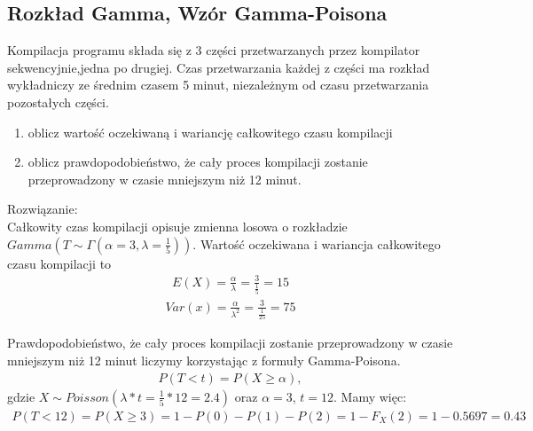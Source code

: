 \documentclass[12pt]{article}
\begin{document}
    \subsection{Rozkład Gamma, Wzór Gamma-Poisona}
    \begin{exercise}
        Kompilacja programu składa się z 3 części przetwarzanych przez kompilator sekwencyjnie,jedna po drugiej.
        Czas przetwarzania każdej z części ma rozkład wykładniczy ze średnim czasem 5 minut, niezależnym od
        czasu przetwarzania pozostałych części.
        \begin{enumerate}
            \item oblicz wartość oczekiwaną i wariancję całkowitego czasu kompilacji
            \item oblicz prawdopodobieństwo, że cały proces kompilacji zostanie przeprowadzony w
            czasie mniejszym niż 12 minut.
        \end{enumerate}
    \end{exercise}
    Rozwiązanie:\\

    Całkowity czas kompilacji opisuje zmienna losowa o rozkładzie $Gamma(T \sim \Gamma(\alpha = 3, \lambda = \frac{1}{5}))$.
    Wartość oczekiwana i wariancja całkowitego czasu kompilacji to
    \begin{align*}
        E(X) = \frac{\alpha}{\lambda} = \frac{3}{\frac{1}{5}} = 15
    \end{align*}
    \begin{align*}
        Var(x) = \frac{\alpha}{\lambda^2} = \frac{3}{\frac{1}{25}}= 75
    \end{align*}

    Prawdopodobieństwo, że cały proces kompilacji zostanie przeprowadzony w
    czasie mniejszym niż 12 minut liczymy korzystając z formuły Gamma-Poisona.
    \begin{align*}
        P(T < t) = P(X \geq \alpha),
    \end{align*}
    gdzie $X \sim Poisson(\lambda*t = \frac{1}{5} * 12 = 2.4)$ oraz $\alpha = 3$, $t = 12$. Mamy więc:
    \begin{align*}
        P(T < 12) = P (X \geq 3) = 1 - P(0) - P(1) - P(2) = 1 - F_X(2) = 1 - 0.5697 = 0.43
    \end{align*}

    \newpage
\end{document}
